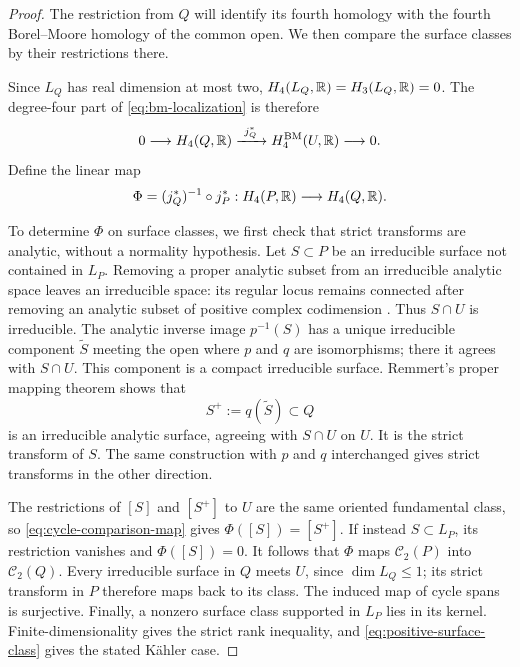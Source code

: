 \begin{proof}
The restriction from $Q$ will identify its fourth homology with the
fourth Borel--Moore homology of the common open.  We then compare the
surface classes by their restrictions there.

Since $L_Q$ has real dimension at most two,
$H_4(L_Q,\mathbb R)=H_3(L_Q,\mathbb R)=0$.  The degree-four part of
\eqref{eq:bm-localization} is therefore
\[
 0\longrightarrow H_4(Q,\mathbb R)
   \xrightarrow{\ j_Q^*\ }H_4^{\mathrm{BM}}(U,\mathbb R)
   \longrightarrow0.
\]
Define the linear map
\begin{equation}\label{eq:cycle-comparison-map}
 \Phi=(j_Q^*)^{-1}\circ j_P^*:
 H_4(P,\mathbb R)\longrightarrow H_4(Q,\mathbb R).
\end{equation}

To determine $\Phi$ on surface classes, we first check that strict
transforms are analytic, without a normality hypothesis.  Let
$S\subset P$ be an irreducible surface not contained in $L_P$.
Removing a proper analytic subset from an irreducible analytic space
leaves an irreducible space: its regular locus remains connected after
removing an analytic subset of positive complex codimension
\cite[Section~3.3]{BorelHaefliger1961}.  Thus
$S\cap U$ is irreducible.  The analytic inverse image $p^{-1}(S)$ has
a unique irreducible component $\widetilde S$ meeting the open where
$p$ and $q$ are isomorphisms; there it agrees with $S\cap U$.
This component is a compact irreducible surface.  Remmert's proper
mapping theorem shows that
\[
 S^+:=q(\widetilde S)\subset Q
\]
is an irreducible analytic surface, agreeing with $S\cap U$ on $U$.
It is the strict transform of $S$.  The same construction with $p$ and
$q$ interchanged gives strict transforms in the other direction.

The restrictions of $[S]$ and $[S^+]$ to $U$ are the same oriented
fundamental class, so \eqref{eq:cycle-comparison-map} gives
$\Phi([S])=[S^+]$.  If instead $S\subset L_P$, its restriction
vanishes and $\Phi([S])=0$.  It follows that $\Phi$ maps
$\mathcal C_2(P)$ into $\mathcal C_2(Q)$.  Every irreducible surface
in $Q$ meets $U$, since $\dim L_Q\leq1$; its strict transform in $P$
therefore maps back to its class.  The induced map of cycle spans is
surjective.  Finally, a nonzero surface class supported in $L_P$ lies
in its kernel.  Finite-dimensionality gives the strict rank inequality,
and \eqref{eq:positive-surface-class} gives the stated K\"ahler case.
\end{proof}

